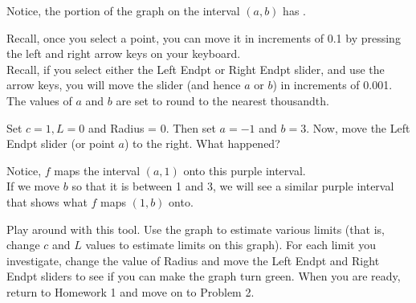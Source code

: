 \documentclass{ximera}
\begin{document}
\begin{exercise}
\begin{question}
\begin{question}
\begin{question}
\begin{question}
        		Notice, the portion of the graph on the interval $(a,b)$ has .
        		\begin{feedback}
        			Recall, once you select a point, you can move it in increments of 0.1 by pressing the left and right arrow keys on your keyboard.\\
        			Recall, if you select either the Left Endpt or Right Endpt slider, and use the arrow keys, you will move the slider (and hence $a$ or $b$) in increments of 0.001.  The values of $a$ and $b$ are set to round to the nearest thousandth.  
        		\end{feedback}
        	\end{question}
        
        \end{question}
      \end{question}
   \end{question}
	\begin{question}
		Set $ c=1, L=0 $ and Radius = 0.  Then set $ a=-1 $ and $ b = 3 $.  Now, move the Left Endpt slider (or point $a$) to the right.  What happened? 
		\begin{feedback}
			Notice, $f$ maps the interval $ (a, 1) $ onto this purple interval.\\
			If we move $b$ so that it is between 1 and 3, we will see a similar purple interval that shows what $f$ maps $ (1,b) $ onto.
		\end{feedback}
	\end{question}
   \begin{question}
   	 Play around with this tool.  Use the graph to estimate various limits (that is, change $c$ and $L$ values to estimate limits on this graph).  For each limit you investigate, change the value of Radius and move the Left Endpt and Right Endpt sliders to see if you can make the graph turn green.  When you are ready, return to Homework 1 and move on to Problem 2.
   \end{question}
 \end{exercise}
\end{document}
